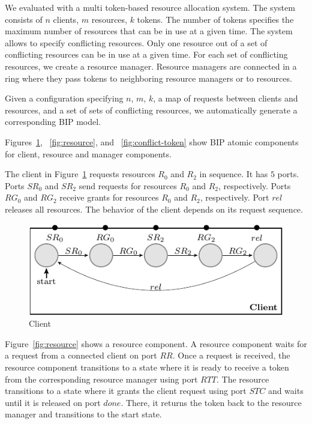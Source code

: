 We evaluated \deadlocktool{} with a multi token-based resource allocation system. 
The system consists of $n$ clients, $m$ resources, $k$ tokens. 
The number of tokens specifies the maximum number of resources that
can be in use at a given time. 
The system allows to specify conflicting resources. 
Only one resource out of a set of conflicting resources can be in use at a given time.
For each set of conflicting resources, we create a resource manager.
Resource managers are connected in a ring where they pass tokens to neighboring resource managers or to resources. 

Given a configuration specifying $n$, $m$, $k$, a map of requests between clients and resources, and a set of sets of conflicting resources, 
we automatically generate a corresponding BIP model.

Figures~\ref{fig:client},
~\ref{fig:resource}, and
~\ref{fig:conflict-token}
show BIP atomic components for client, resource and manager components. 

The client in Figure~\ref{fig:client} requests resources $R_0$ and $R_2$ in sequence. It has $5$ ports. 
Ports $SR_0$ and $SR_2$ send requests for 
resources $R_0$ and $R_2$, respectively.
Ports $RG_0$ and $RG_2$ receive grants for 
resources $R_0$ and $R_2$, respectively.
Port $rel$ releases all resources. 
The behavior of the client depends on its request sequence. 

\begin{figure}[H]
\begin{center}
\includegraphics[scale=1.2]{compiledfigures/client-crop.pdf}
\caption{Client}
\label{fig:client}
\end{center}
\end{figure}

Figure~\ref{fig:resource} shows a resource component. 
A resource component waits for a request from a connected client on port $RR$. 
Once a request is received, the resource component transitions to a state where it is ready to 
receive a token from the corresponding resource manager using port $RTT$.
The resource transitions to a state where it grants the client request using port $STC$ and waits until it is released on port $done$. 
There, it returns the token back to the resource manager and transitions to the start state. 

